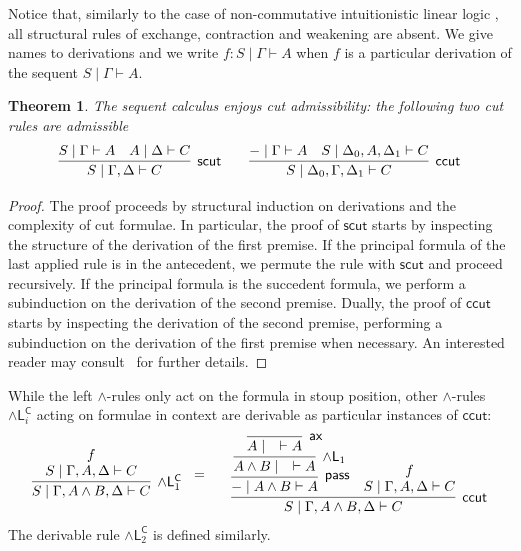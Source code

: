 \documentclass[submission,copyright,creativecommons]{eptcs}
\newtheorem{theorem}{Theorem}[section]
\theoremstyle{definition}
\newcommand{\pass}{\mathsf{pass}}
\newcommand{\andlone}{\land \mathsf{L}_{1}}
\newcommand{\andltwo}{\land \mathsf{L}_{2}}
\newcommand{\andli}{\land \mathsf{L}_{i}}
\newcommand{\ax}{\mathsf{ax}}
\newcommand{\proofbox}[1]{\begin{tabular}{l} #1 \end{tabular}}
\begin{document}
Notice that, similarly to the case of non-commutative intuitionistic linear logic \cite{abrusci:noncommutative:1990}, all structural rules of exchange, contraction and weakening are absent. We give names to derivations and we write $f : S \mid \Gamma \vdash A$ when $f$ is a particular derivation of the sequent $S \mid \Gamma \vdash A$.

\begin{theorem}\label{thm:cut}
  The sequent calculus enjoys cut admissibility: the following two cut rules are admissible
    \begin{displaymath}
      \infer[\mathsf{scut}]{S \mid \Gamma , \Delta \vdash C}{
        S \mid \Gamma \vdash A
        &
        A \mid \Delta \vdash C
      }
      \qquad
      \infer[\mathsf{ccut}]{S \mid \Delta_0 , \Gamma , \Delta_1 \vdash C}{
        {-} \mid \Gamma \vdash A
        &
        S \mid \Delta_0 , A , \Delta_1 \vdash C
      }
    \end{displaymath}
\end{theorem}
\begin{proof}
  The proof proceeds by structural induction on derivations and the complexity of cut formulae.
  In particular, the proof of $\mathsf{scut}$ starts by inspecting the structure of the derivation of the first premise. If the principal formula of the last applied rule is in the antecedent, we permute the rule with $\mathsf{scut}$ and proceed recursively. If the principal formula is the succedent formula, we perform a subinduction on the derivation of the second premise. 
  Dually, the proof of $\mathsf{ccut}$ starts by inspecting the derivation of the second premise, performing a subinduction on the derivation of the first premise when necessary. An interested reader may consult~\cite[Lemma 5]{uustalu:sequent:2021} for further details.
\end{proof} 
While the left $\land$-rules only act on the formula in stoup position, other $\land$-rules $\andli^{\mathsf{C}}$ acting on formulae in context are derivable as particular instances of $\mathsf{ccut}$:
  \begin{displaymath}
      \proofbox{
        \infer[\andlone^{\mathsf{C}}]{S \mid \Gamma , A \land B , \Delta \vdash C}{
          \deduce{S \mid \Gamma , A ,\Delta \vdash C}{f}
        }
      }
      =
      \quad
      \proofbox{
        \infer[\mathsf{ccut}]{S \mid \Gamma , A \land B , \Delta \vdash C}{
          \infer[\pass]{{-} \mid A \land B \vdash A}{
            \infer[\andlone]{A \land B \mid \quad \vdash A}{
              \infer[\ax]{A \mid \quad \vdash A}{}
            }
          }
          &
          \deduce{S \mid \Gamma , A , \Delta \vdash C}{f}
        }
      }
  \end{displaymath}
  The derivable rule $\andltwo^{\mathsf{C}}$ is defined similarly.
  
\end{document}
